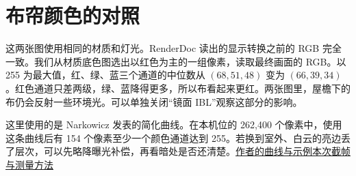 
\clearpage
\section{布帘颜色的对照}

\begin{figure}[H]\centering
{}\hfill
{}
\end{figure}

这两张图使用相同的材质和灯光。RenderDoc 读出的显示转换之前的 RGB 完全一致。我们从材质底色图选出以红色为主的一组像素，读取最终画面的 RGB。以 255 为最大值，红、绿、蓝三个通道的中位数从 $(68,51,48)$ 变为 $(66,39,34)$。红色通道只差两级，绿、蓝降得更多，所以布看起来更红。两张图里，屋檐下的布仍会反射一些环境光。可以单独关闭“镜面 IBL”观察这部分的影响。

这里使用的是 Narkowicz 发表的简化曲线。在本机位的 262,400 个像素中，使用这条曲线后有 154 个像素至少一个颜色通道达到 255。若换到室外、白云的亮边丢了层次，可以先略降曝光补偿，再看暗处是否还清楚。\href{https://knarkowicz.wordpress.com/2016/01/06/aces-filmic-tone-mapping-curve/}{作者的曲线与示例}\quad\href{run:../validation/atrium-sky/README.md}{本次截帧与测量方法}

